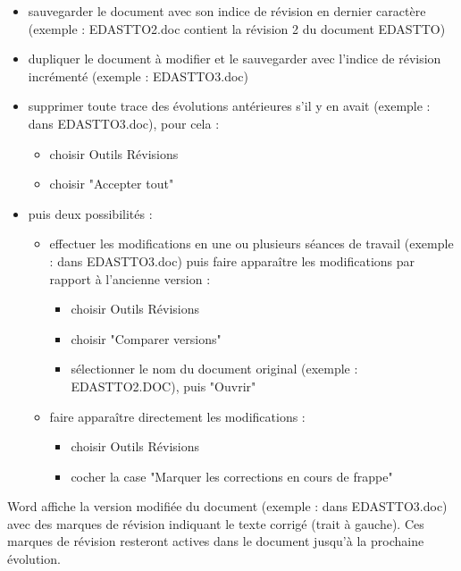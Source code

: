 \documentclass[a4paper]{article}
\begin{document}
\begin{itemize}

\item sauvegarder le document avec son indice de révision en dernier caractère (exemple : EDASTTO2.doc  contient la révision 2 du document EDASTTO)

\item dupliquer le document à modifier et le sauvegarder avec l'indice de révision incrémenté (exemple : EDASTTO3.doc)

\item supprimer toute trace des évolutions antérieures s'il y en avait (exemple : dans EDASTTO3.doc), pour cela :

\begin{itemize}
\item choisir Outils Révisions
\item choisir "Accepter tout"
\end{itemize}

\item puis deux possibilités :

\begin{itemize}

\item effectuer les modifications en une ou plusieurs séances de travail (exemple : dans EDASTTO3.doc) puis faire apparaître les modifications par rapport à l'ancienne version :

\begin{itemize}
\item choisir Outils Révisions
\item choisir "Comparer versions"
\item sélectionner le nom du document original (exemple : EDASTTO2.DOC), puis "Ouvrir"
\end{itemize}

\item faire apparaître directement les modifications :

\begin{itemize}
\item choisir Outils Révisions
\item cocher la case "Marquer les corrections en cours de frappe"
\end{itemize}

\end{itemize}
\end{itemize}

Word affiche la version modifiée du document (exemple : dans EDASTTO3.doc) avec des marques de révision indiquant le texte corrigé (trait à gauche). Ces marques de révision resteront actives dans le document jusqu'à la prochaine évolution.
\end{document}
